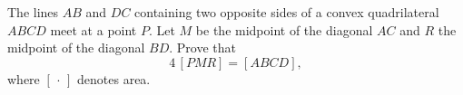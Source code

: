 The lines $AB$ and $DC$ containing two opposite sides of a convex quadrilateral $ABCD$ meet at a point $P$. Let $M$ be the midpoint of the diagonal $AC$ and $R$ the midpoint of the diagonal $BD$. Prove that
\[
4\,[PMR]=[ABCD],
\]
where $[\,\cdot\,]$ denotes area.
